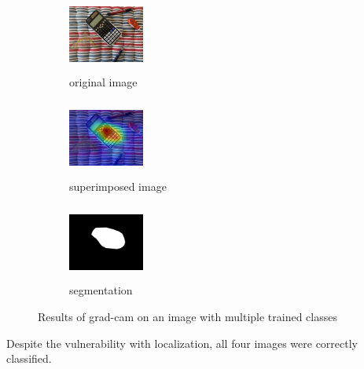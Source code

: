 \documentclass[../ImageClassifier.tex]{subfiles}
\begin{document}
    \begin{figure}[H]
      \begin{subfigure}{.32\textwidth}
        \centering
        \includegraphics[height=2.5cm, width=2.5cm]{./attachments/results/0-calculator.jpg}
        \caption{original image}
        \label{fig:original image}
      \end{subfigure}
      \begin{subfigure}{.32\textwidth}
        \centering
        \includegraphics[height=2.5cm, width=2.5cm]{./attachments/results/0-calculator-grad.jpg}
        \caption{superimposed image}
        \label{fig:heatmap activasion}
      \end{subfigure}
      \begin{subfigure}{.32\textwidth}
          \centering
          \includegraphics[height=2.5cm, width=2.5cm]{./attachments/results/0-calculator-seg.jpg}
          \caption{segmentation}
          \label{fig:heatmap resized}
      \end{subfigure}
      \caption{Results of \ac{grad-cam} on an image with multiple trained classes}
      \label{fig:grad cam mixed}
    \end{figure}
    Despite the vulnerability with localization, all four images were correctly classified.
\end{document}
